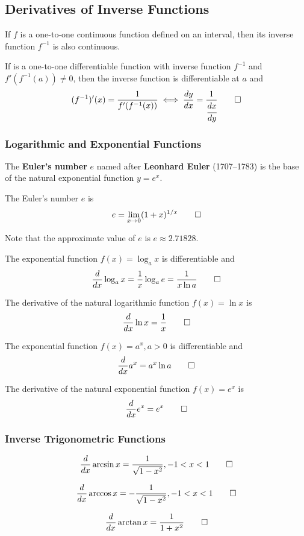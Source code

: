 \subsection{Derivatives of Inverse Functions}
\begin{theorem}
    If \(f\) is a one-to-one continuous function defined on an interval,
    then its inverse function \(f^{-1}\) is also continuous.
\end{theorem}
\begin{theorem}
    If is a one-to-one differentiable function with inverse function \(f^{-1}\)
    and \(f'(f^{-1}(a))\neq 0\), then the inverse function is differentiable at \(a\) and
    \[(f^{-1})'(x)=\frac{1}{f'(f^{-1}(x))}\iff\frac{dy}{dx}
    =\frac{1}{\cfrac{dx}{dy}}\qedhere\]
\end{theorem}

\subsubsection{Logarithmic and Exponential Functions}
The \textbf{Euler's number} \(e\) named after \textbf{Leonhard Euler} (1707--1783)
is the base of the natural exponential function \(y=e^x\).
\begin{definition}
    The Euler's number \(e\) is \[e=\lim_{x\to 0}(1+x)^{1/x}\qedhere\]
\end{definition}
Note that the approximate value of \(e\) is \(e\approx2.71828\).
\begin{theorem}
    The exponential function \(f(x)=\log_a x\) is differentiable and
    \[\frac{d}{dx}\log_a x=\frac{1}{x}\log_a e=\frac{1}{x\ln a}\qedhere\]
\end{theorem}
\begin{theorem}
    The derivative of the natural logarithmic function \(f(x)=\ln x\) is
    \[\frac{d}{dx}\ln x=\frac{1}{x}\qedhere\]
\end{theorem}
\begin{theorem}
    The exponential function \(f(x)=a^x,a>0\) is differentiable and
    \[\frac{d}{dx}a^x=a^x\ln a\qedhere\]
\end{theorem}
\begin{theorem}
    The derivative of the natural exponential function \(f(x)=e^x\) is
    \[\frac{d}{dx}e^x=e^x\qedhere\]
\end{theorem}

\subsubsection{Inverse Trigonometric Functions}
\begin{theorem}
    \[\frac{d}{dx}\arcsin x=\frac{1}{\sqrt{1-x^2}},-1<x<1\qedhere\]
\end{theorem}
\begin{theorem}
    \[\frac{d}{dx}\arccos x=-\frac{1}{\sqrt{1-x^2}},-1<x<1\qedhere\]
\end{theorem}
\begin{theorem}
    \[\frac{d}{dx}\arctan x=\frac{1}{1+x^2}\qedhere\]
\end{theorem}